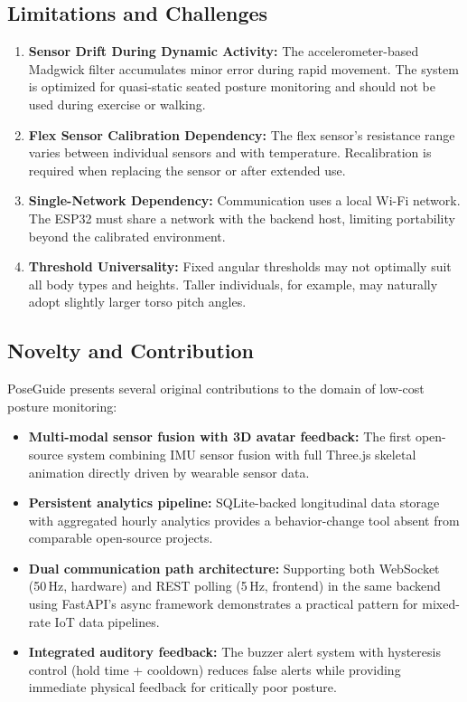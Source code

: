 \documentclass[12pt,a4paper]{report}
\begin{document}
\subsection{Limitations and Challenges}

\begin{enumerate}[leftmargin=2em]
    \item \textbf{Sensor Drift During Dynamic Activity:} The accelerometer-based Madgwick filter accumulates minor error during rapid movement. The system is optimized for quasi-static seated posture monitoring and should not be used during exercise or walking.
    \item \textbf{Flex Sensor Calibration Dependency:} The flex sensor's resistance range varies between individual sensors and with temperature. Recalibration is required when replacing the sensor or after extended use.
    \item \textbf{Single-Network Dependency:} Communication uses a local Wi-Fi network. The ESP32 must share a network with the backend host, limiting portability beyond the calibrated environment.
    \item \textbf{Threshold Universality:} Fixed angular thresholds may not optimally suit all body types and heights. Taller individuals, for example, may naturally adopt slightly larger torso pitch angles.
\end{enumerate}

\subsection{Novelty and Contribution}

PoseGuide presents several original contributions to the domain of low-cost posture monitoring:

\begin{itemize}[leftmargin=2em]
    \item \textbf{Multi-modal sensor fusion with 3D avatar feedback:} The first open-source system combining IMU sensor fusion with full Three.js skeletal animation directly driven by wearable sensor data.
    \item \textbf{Persistent analytics pipeline:} SQLite-backed longitudinal data storage with aggregated hourly analytics provides a behavior-change tool absent from comparable open-source projects.
    \item \textbf{Dual communication path architecture:} Supporting both WebSocket (50\,Hz, hardware) and REST polling (5\,Hz, frontend) in the same backend using FastAPI's async framework demonstrates a practical pattern for mixed-rate IoT data pipelines.
    \item \textbf{Integrated auditory feedback:} The buzzer alert system with hysteresis control (hold time + cooldown) reduces false alerts while providing immediate physical feedback for critically poor posture.
\end{itemize}
\end{document}
